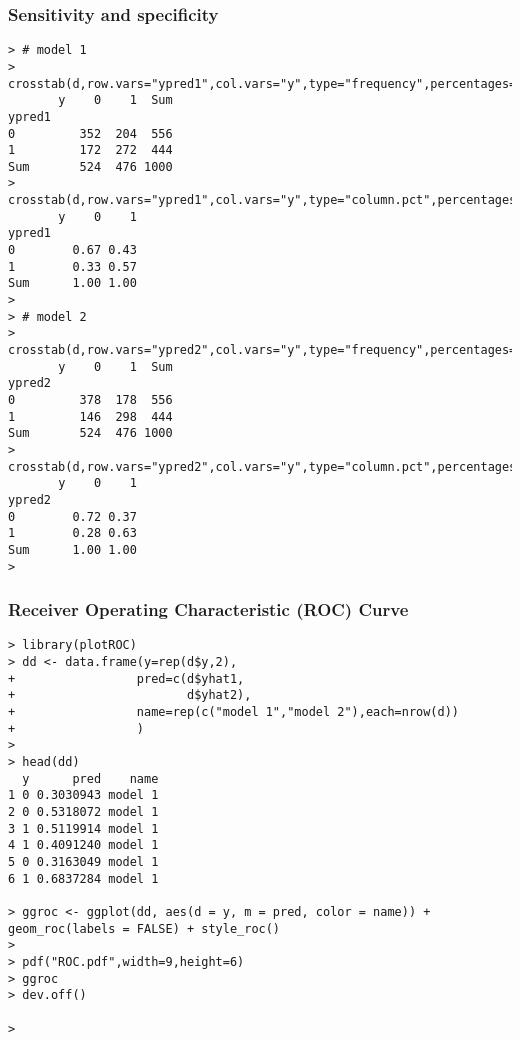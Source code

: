 \documentclass[xcolor=dvipsnames]{beamer}
\begin{document}
\begin{frame}[fragile]
\frametitle{Sensitivity and specificity}

\begin{Verbatim}[fontsize=\tiny, frame=single, label=R Code]
> # model 1
> crosstab(d,row.vars="ypred1",col.vars="y",type="frequency",percentages=F)
       y    0    1  Sum
ypred1                 
0         352  204  556
1         172  272  444
Sum       524  476 1000
> crosstab(d,row.vars="ypred1",col.vars="y",type="column.pct",percentages=F)
       y    0    1
ypred1            
0        0.67 0.43
1        0.33 0.57
Sum      1.00 1.00
> 
> # model 2
> crosstab(d,row.vars="ypred2",col.vars="y",type="frequency",percentages=F)
       y    0    1  Sum
ypred2                 
0         378  178  556
1         146  298  444
Sum       524  476 1000
> crosstab(d,row.vars="ypred2",col.vars="y",type="column.pct",percentages=F)
       y    0    1
ypred2            
0        0.72 0.37
1        0.28 0.63
Sum      1.00 1.00
> \end{Verbatim}
\end{frame}


\begin{frame}[fragile]
\frametitle{Receiver Operating Characteristic (ROC) Curve}
\begin{Verbatim}[fontsize=\tiny, frame=single, label=R Code]
> library(plotROC)
> dd <- data.frame(y=rep(d$y,2),
+                 pred=c(d$yhat1,
+                        d$yhat2),
+                 name=rep(c("model 1","model 2"),each=nrow(d))
+                 )
> 
> head(dd)
  y      pred    name
1 0 0.3030943 model 1
2 0 0.5318072 model 1
3 1 0.5119914 model 1
4 1 0.4091240 model 1
5 0 0.3163049 model 1
6 1 0.6837284 model 1

> ggroc <- ggplot(dd, aes(d = y, m = pred, color = name)) + geom_roc(labels = FALSE) + style_roc()
> 
> pdf("ROC.pdf",width=9,height=6)
> ggroc 
> dev.off()

> \end{Verbatim}
\end{frame}
\end{document}
